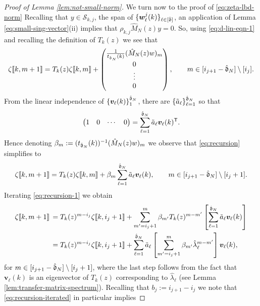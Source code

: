 \documentclass{amsart}
\numberwithin{equation}{section}
\def\corEE{\textcolor{amethyst}}
\def\corEE{}
\begin{document}
\begin{proof}[Proof of Lemma \ref{lem:not-small-norm}]
We turn now to the proof of \eqref{eq:zeta-lbd-norm}
Recalling that $y \in {\mathcal S}_{k,j}$, the span of $\{{\bm w}_\ell^j(k)\}_{\ell \in [\hat{\mathfrak{d}}]}$, an application of Lemma \ref{eq:small-sing-vector}(ii) implies that $\rho_{k,j} \hat{M}_N(z)y=0$. So, using \eqref{eq:d-lin-eqn-1} and recalling the definition of $T_k(z)$ we see that
\begin{equation}\label{eq:recursion}
\zeta \dvec{k,m+1}= T_k(z) \zeta\dvec{k,m} + \begin{pmatrix} \frac{1}{t_{\hat\gd_N}(k)}(\hat{M}_N(z) w)_{m} \\ 0 \\ \vdots  \\ 0 \end{pmatrix}, \qquad m \in [i_{j+1}-\hat\gd_N]\setminus [i_j]. %
\end{equation}
\corEE{From the linear independence of $\left\{ {\bm v}_\ell(k) \right\}_{1}^{\hat{\mathfrak{d}}_N}$,
there are  $\{\tilde{a}_\ell\}_{\ell=1}^{\hat{\mathfrak{d}}_N}$ so that}
\begin{equation}\label{eq:tilde-alpha}
\begin{pmatrix} 1 & 0 & \cdots & 0 \end{pmatrix} = \sum_{\ell=1}^{\hat{\mathfrak{d}}_N} \tilde{a}_\ell {\bm v}_\ell(k)^{\sf T}.
\end{equation}
Hence denoting $\beta_m:= (t_{\hat{\mathfrak{d}}_N}(k))^{-1}(\hat{M}_N(z)w)_m$ %
we observe that \eqref{eq:recursion} simplifies to
\begin{equation}\label{eq:recursion-1}
\zeta\dvec{k,m+1}= T_k(z) \zeta\dvec{k,m} + \beta_m\sum_{\ell=1}^{\hat\gd_N} \tilde{a}_\ell {\bm v}_\ell(k), \qquad m \in[i_{j+1}-\hat\gd_N]\setminus [i_j+1]. %
\end{equation}
Iterating \eqref{eq:recursion-1} we obtain
\begin{align}\label{eq:recursion-iterated}
\zeta\llbracket k,m+1 \rrbracket & \, = T_k(z)^{m-i_j} \zeta\llbracket k,i_j+1 \rrbracket + \sum_{m'=i_j+1}^m \beta_{m'} T_k(z)^{m-m'} \left[\sum_{\ell=1}^{\hat{\mathfrak{d}}_N} \tilde{a}_\ell {\bm v}_\ell(k)\right] \notag\\
& \, = T_k(z)^{m-i_j} \zeta\llbracket k, i_j+1 \rrbracket + \sum_{\ell=1}^{\hat{\mathfrak{d}}_N} \tilde{a}_\ell \left[\sum_{m'=i_j+1}^m \beta_{m'} \hat{\lambda}_\ell^{m-m'} \right] {\bm v}_\ell(k),
\end{align}
for $m \in [i_{j+1}-\hat{\mathfrak{d}}_N]\setminus[i_j+1]$, where the last step follows from the fact that ${\bm v}_\ell(k)$ is an eigenvector of $T_{k}(z)$ corresponding to $\hat{\lambda}_\ell$ (see Lemma \ref{lem:transfer-matrix-spectrum}). Recalling that $b_j:=i_{j+1}-i_j$ we note that \eqref{eq:recursion-iterated} in particular implies

\end{proof}
\end{document}

